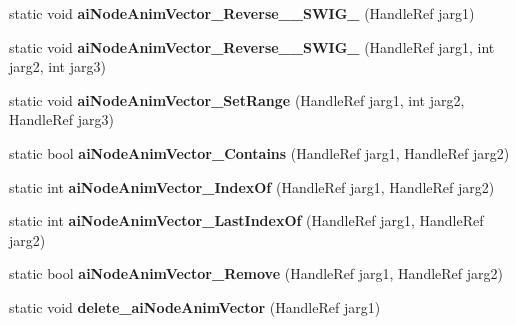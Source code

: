 \begin{DoxyCompactItemize}
\item 
\hypertarget{class_assimp_p_i_n_v_o_k_e_a967ec9723ab8b36e5620f283b091bc5c}{static void {\bfseries ai\+Node\+Anim\+Vector\+\_\+\+Reverse\+\_\+\+\_\+\+S\+W\+I\+G\+\_} (Handle\+Ref jarg1)}\label{class_assimp_p_i_n_v_o_k_e_a967ec9723ab8b36e5620f283b091bc5c}

\item 
\hypertarget{class_assimp_p_i_n_v_o_k_e_a15933d52b65ec81b52bea7fa40b6de5d}{static void {\bfseries ai\+Node\+Anim\+Vector\+\_\+\+Reverse\+\_\+\+\_\+\+S\+W\+I\+G\+\_} (Handle\+Ref jarg1, int jarg2, int jarg3)}\label{class_assimp_p_i_n_v_o_k_e_a15933d52b65ec81b52bea7fa40b6de5d}

\item 
\hypertarget{class_assimp_p_i_n_v_o_k_e_a429407224e9f8f0ad888f56e5ba1c4d4}{static void {\bfseries ai\+Node\+Anim\+Vector\+\_\+\+Set\+Range} (Handle\+Ref jarg1, int jarg2, Handle\+Ref jarg3)}\label{class_assimp_p_i_n_v_o_k_e_a429407224e9f8f0ad888f56e5ba1c4d4}

\item 
\hypertarget{class_assimp_p_i_n_v_o_k_e_a4adf94ec7dac029712f6e02bf1ced5b4}{static bool {\bfseries ai\+Node\+Anim\+Vector\+\_\+\+Contains} (Handle\+Ref jarg1, Handle\+Ref jarg2)}\label{class_assimp_p_i_n_v_o_k_e_a4adf94ec7dac029712f6e02bf1ced5b4}

\item 
\hypertarget{class_assimp_p_i_n_v_o_k_e_a20211dacafbdc45d4436b76a6baf97f4}{static int {\bfseries ai\+Node\+Anim\+Vector\+\_\+\+Index\+Of} (Handle\+Ref jarg1, Handle\+Ref jarg2)}\label{class_assimp_p_i_n_v_o_k_e_a20211dacafbdc45d4436b76a6baf97f4}

\item 
\hypertarget{class_assimp_p_i_n_v_o_k_e_a1362651c849a524779bb7b3299f462ae}{static int {\bfseries ai\+Node\+Anim\+Vector\+\_\+\+Last\+Index\+Of} (Handle\+Ref jarg1, Handle\+Ref jarg2)}\label{class_assimp_p_i_n_v_o_k_e_a1362651c849a524779bb7b3299f462ae}

\item 
\hypertarget{class_assimp_p_i_n_v_o_k_e_a0606b12c2f791601c623f0f7b166a9cc}{static bool {\bfseries ai\+Node\+Anim\+Vector\+\_\+\+Remove} (Handle\+Ref jarg1, Handle\+Ref jarg2)}\label{class_assimp_p_i_n_v_o_k_e_a0606b12c2f791601c623f0f7b166a9cc}

\item 
\hypertarget{class_assimp_p_i_n_v_o_k_e_a87a23a90ec206929ad27f6478599540f}{static void {\bfseries delete\+\_\+ai\+Node\+Anim\+Vector} (Handle\+Ref jarg1)}\label{class_assimp_p_i_n_v_o_k_e_a87a23a90ec206929ad27f6478599540f}


\end{DoxyCompactItemize}
